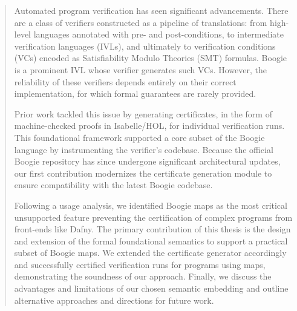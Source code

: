 \begin{abstract}
Automated program verification has seen significant advancements. 
There are a class of verifiers constructed as a pipeline of translations: from high-level languages 
annotated with pre- and post-conditions, to intermediate verification languages (IVLs), 
and ultimately to verification conditions (VCs) encoded as Satisfiability Modulo Theories (SMT) formulas. 
Boogie is a prominent IVL whose verifier generates such VCs. However, the reliability of these 
verifiers depends entirely on their correct implementation, for which formal guarantees are rarely provided.

Prior work tackled this issue by generating certificates,
in the form of machine-checked proofs in Isabelle/HOL,
for individual verification runs.
This foundational framework supported a core 
subset of the Boogie language by instrumenting the verifier's codebase. Because the official Boogie 
repository has since undergone significant architectural updates, our first contribution modernizes 
the certificate generation module to ensure compatibility with the latest Boogie codebase.

Following a usage analysis, we identified Boogie maps as the most critical unsupported feature 
preventing the certification of complex programs from front-ends like Dafny. The primary contribution 
of this thesis is the design and extension of the formal foundational semantics to support a 
practical subset of Boogie maps. We extended the certificate generator accordingly and successfully 
certified verification runs for programs using maps, demonstrating the soundness of our approach. 
Finally, we discuss the advantages and limitations of our chosen semantic embedding and outline 
alternative approaches and directions for future work.
\end{abstract}
